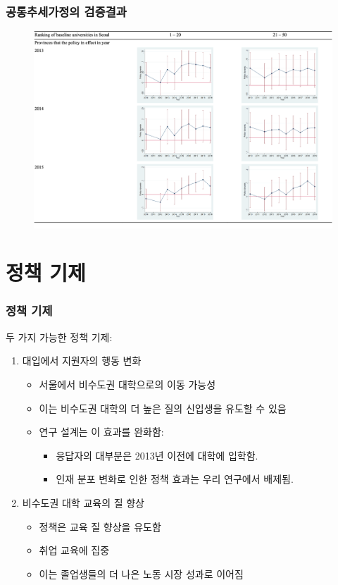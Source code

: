 \documentclass[aspectratio=169,xcolor=dvipsnames,handout]{beamer}
\begin{document}
\begin{frame}
    \frametitle{공통추세가정의 검증결과}
    \centering
    \begin{figure}
        \includegraphics[width=.7\textwidth]{pic/pttest.png}
    \end{figure}
\end{frame}


\section{정책 기제}%
\begin{frame}
    \frametitle{정책 기제}
    두 가지 가능한 정책 기제:
    \begin{enumerate}[<+->]
        \item 대입에서 지원자의 행동 변화
        \begin{itemize}
            \item 서울에서 비수도권 대학으로의 이동 가능성
            \item 이는 비수도권 대학의 더 높은 질의 신입생을 유도할 수 있음
            \item 연구 설계는 이 효과를 완화함:
            \begin{itemize}
            \item 응답자의 대부분은 2013년 이전에 대학에 입학함.
            \item 인재 분포 변화로 인한 정책 효과는 우리 연구에서 배제됨.
            \end{itemize}
        \end{itemize}
        \item 비수도권 대학 교육의 질 향상
        \begin{itemize}
            \item 정책은 교육 질 향상을 유도함
            \item 취업 교육에 집중
            \item 이는 졸업생들의 더 나은 노동 시장 성과로 이어짐
        \end{itemize}
    \end{enumerate}
\end{frame}
\end{document}
